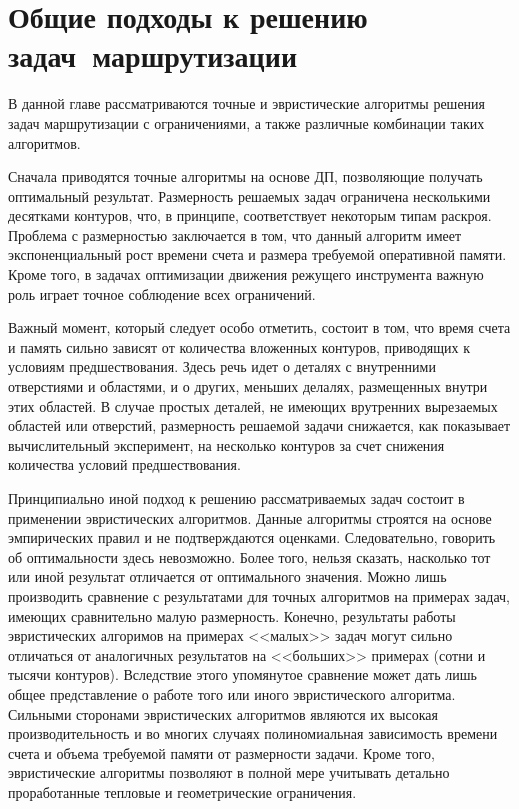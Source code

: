 
\section{
  Общие подходы
  к решению задач~маршрутизации
}
\label{sect:5.1}

В данной главе рассматриваются точные и эвристические алгоритмы решения задач
маршрутизации с ограничениями,
а также различные комбинации таких алгоритмов.

Сначала приводятся точные алгоритмы на основе ДП,
позволяющие получать оптимальный результат.
Размерность решаемых задач ограничена несколькими десятками контуров,
что, в принципе, соответствует некоторым типам раскроя.
Проблема с размерностью заключается в том,
что данный алгоритм имеет экспоненциальный рост времени счета
и размера требуемой оперативной памяти.
Кроме того, в задачах оптимизации движения режущего инструмента важную роль
играет точное соблюдение всех ограничений.

Важный момент, который следует особо отметить, состоит в том,
что время счета и память сильно зависят от количества вложенных контуров,
приводящих к условиям предшествования.
Здесь речь идет о деталях с внутренними отверстиями
и областями, и о других, меньших делалях, размещенных внутри этих областей.
В случае простых деталей, не имеющих врутренних вырезаемых областей или отверстий,
размерность решаемой задачи снижается,
как показывает вычислительный эксперимент,
на несколько контуров за счет снижения количества условий предшествования.

Принципиально иной подход к решению рассматриваемых задач состоит в применении
эвристических алгоритмов.
Данные алгоритмы строятся на основе эмпирических правил и не подтверждаются оценками.
Следовательно, говорить об оптимальности здесь невозможно.
Более того, нельзя сказать,
насколько тот или иной результат отличается от оптимального значения.
Можно лишь производить сравнение с результатами
для точных алгоритмов на примерах задач, имеющих сравнительно малую размерность.
Конечно, результаты работы эвристических алгоримов на примерах <<малых>>
задач могут сильно отличаться от аналогичных результатов на <<больших>> примерах
(сотни и тысячи контуров).
Вследствие этого упомянутое сравнение может дать лишь
общее представление о работе того или иного эвристического алгоритма.
Сильными сторонами эвристических алгоритмов являются их высокая производительность
и во многих случаях полиномиальная зависимость времени счета и объема
требуемой памяти от размерности задачи.
Кроме того, эвристические алгоритмы позволяют в полной мере учитывать
детально проработанные тепловые и геометрические ограничения.

